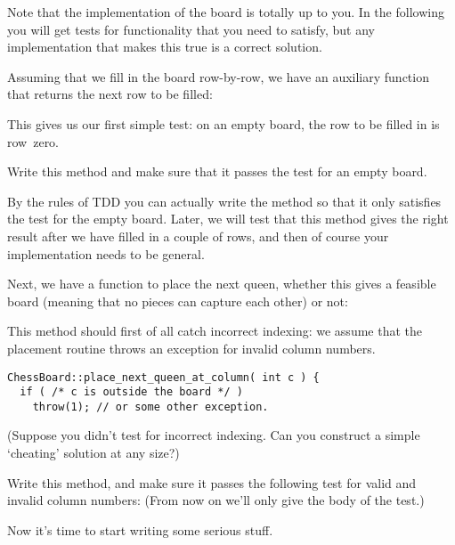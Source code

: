Note that the implementation of the board is totally up to you.
In the following you will get tests for functionality
that you need to satisfy, but any implementation that makes this true
is a correct solution.


Assuming that we fill in the board row-by-row,
we have an auxiliary function that returns  the next row to be filled:

This gives us our first simple test:
on an empty board, the row to be filled in is row~zero.

\begin{exercise}
  Write this method and make sure that it passes the test for an empty board.
\end{exercise}

By the rules of \ac{TDD} you can actually write the method so that it only
satisfies the test for the empty board.
Later, we will test that this method gives the right result
after we have filled in a couple of rows,
and then of course your implementation needs to be general.


Next, we have a function to place the next queen,
whether this gives a feasible board
(meaning that no pieces can capture each other) or not:

This method should first of all catch incorrect indexing:
we assume that the placement routine throws an exception
for invalid column numbers.
\begin{lstlisting}
ChessBoard::place_next_queen_at_column( int c ) {
  if ( /* c is outside the board */ )
    throw(1); // or some other exception.
\end{lstlisting}

(Suppose you didn't test for incorrect indexing.
Can you construct a simple `cheating' solution
at any size?)

\begin{exercise}
  Write this method, and make sure it passes the following test for
  valid and invalid column numbers:
  (From now on we'll only give the body of the test.)
\end{exercise}

Now it's time to start writing some serious stuff.


